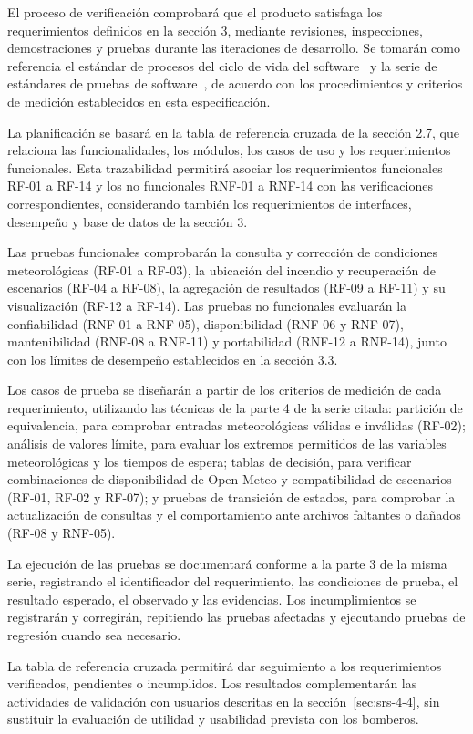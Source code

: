 
\label{sec:srs-5}

El proceso de verificación comprobará que el producto satisfaga los requerimientos definidos en la sección 3, mediante revisiones, inspecciones, demostraciones y pruebas durante las iteraciones de desarrollo. Se tomarán como referencia el estándar de procesos del ciclo de vida del software~\cite{iso12207_2026} y la serie de estándares de pruebas de software~\cite{iso29119_2021}, de acuerdo con los procedimientos y criterios de medición establecidos en esta especificación.

La planificación se basará en la tabla de referencia cruzada de la sección 2.7, que relaciona las funcionalidades, los módulos, los casos de uso y los requerimientos funcionales. Esta trazabilidad permitirá asociar los requerimientos funcionales RF-01 a RF-14 y los no funcionales RNF-01 a RNF-14 con las verificaciones correspondientes, considerando también los requerimientos de interfaces, desempeño y base de datos de la sección 3.

Las pruebas funcionales comprobarán la consulta y corrección de condiciones meteorológicas (RF-01 a RF-03), la ubicación del incendio y recuperación de escenarios (RF-04 a RF-08), la agregación de resultados (RF-09 a RF-11) y su visualización (RF-12 a RF-14). Las pruebas no funcionales evaluarán la confiabilidad (RNF-01 a RNF-05), disponibilidad (RNF-06 y RNF-07), mantenibilidad (RNF-08 a RNF-11) y portabilidad (RNF-12 a RNF-14), junto con los límites de desempeño establecidos en la sección 3.3.

Los casos de prueba se diseñarán a partir de los criterios de medición de cada requerimiento, utilizando las técnicas de la parte 4 de la serie citada: partición de equivalencia, para comprobar entradas meteorológicas válidas e inválidas (RF-02); análisis de valores límite, para evaluar los extremos permitidos de las variables meteorológicas y los tiempos de espera; tablas de decisión, para verificar combinaciones de disponibilidad de Open-Meteo y compatibilidad de escenarios (RF-01, RF-02 y RF-07); y pruebas de transición de estados, para comprobar la actualización de consultas y el comportamiento ante archivos faltantes o dañados (RF-08 y RNF-05).

La ejecución de las pruebas se documentará conforme a la parte 3 de la misma serie, registrando el identificador del requerimiento, las condiciones de prueba, el resultado esperado, el observado y las evidencias. Los incumplimientos se registrarán y corregirán, repitiendo las pruebas afectadas y ejecutando pruebas de regresión cuando sea necesario.

La tabla de referencia cruzada permitirá dar seguimiento a los requerimientos verificados, pendientes o incumplidos. Los resultados complementarán las actividades de validación con usuarios descritas en la sección~\ref{sec:srs-4-4}, sin sustituir la evaluación de utilidad y usabilidad prevista con los bomberos.
